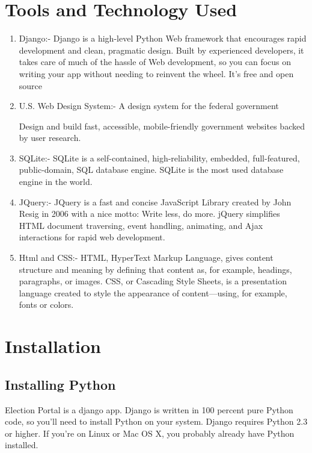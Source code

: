 \documentclass[12pt]{article}
\begin{document}
\section{Tools and Technology Used}

\begin{enumerate}
\item Django:- Django is a high-level Python Web framework that encourages rapid development and clean, pragmatic design. Built by experienced developers, it takes care of much of the hassle of Web development, so you can focus on writing your app without needing to reinvent the wheel. It’s free and open source

\item 
U.S. Web Design System:- 
A design system for the federal government

Design and build fast, accessible, mobile-friendly government websites backed by user research.


\item SQLite:- SQLite is a self-contained, high-reliability, embedded, full-featured, public-domain, SQL database engine. SQLite is the most used database engine in the world.

\item JQuery:- JQuery is a fast and concise JavaScript Library created by John Resig in 2006 with a nice motto: Write less, do more. jQuery simplifies HTML document traversing, event handling, animating, and Ajax interactions for rapid web development.

\item Html and CSS:- HTML, HyperText Markup Language, gives content structure and meaning by defining that content as, for example, headings, paragraphs, or images. CSS, or Cascading Style Sheets, is a presentation language created to style the appearance of content—using, for example, fonts or colors.
\end{enumerate}
\newpage
\section{Installation}
\subsection{Installing Python}

Election Portal is a django app. Django is written in 100 percent pure Python code, so you’ll need to install Python on your system. Django requires Python 2.3 or higher.
If you’re on Linux or Mac OS X, you probably already have Python installed.
\end{document}

